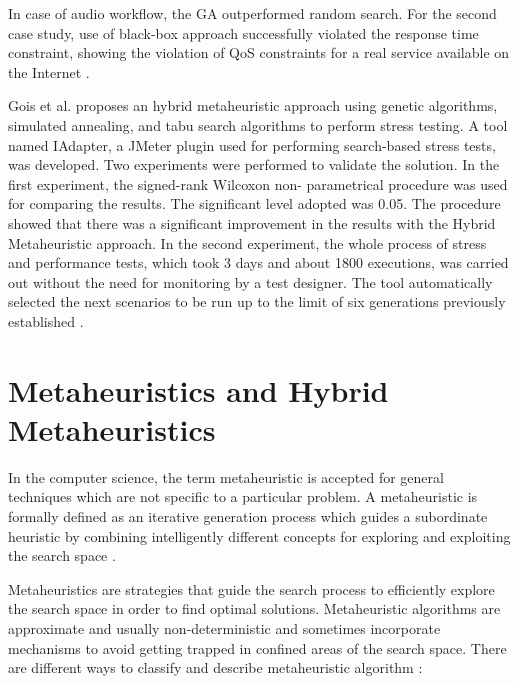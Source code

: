 In case of audio workflow, the GA outperformed random search. For the second case study, use of black-box approach successfully violated the response time constraint, showing the violation of QoS constraints for a real service available on the Internet \cite{Penta2007}.


Gois et al. proposes an hybrid metaheuristic approach using genetic algorithms, simulated annealing, and tabu search algorithms to perform stress testing. A tool named IAdapter, a JMeter plugin used for performing search-based stress tests, was developed. Two experiments were performed to validate the solution. In the first experiment, the signed-rank Wilcoxon non- parametrical procedure was used for comparing the results. The significant level adopted was 0.05. The procedure showed that there was a significant improvement in the results with the Hybrid Metaheuristic approach.
In the second experiment, the whole process of stress and performance tests, which took 3 days and about 1800 executions, was carried out without the need for monitoring by a test designer. The tool automatically selected the next scenarios to be run up to the limit of six generations previously established \cite{Gois2016}. 

\section{Metaheuristics and Hybrid Metaheuristics}

In the computer science, the term metaheuristic is accepted for general techniques which are not specific to a particular problem. A metaheuristic is formally defined as an iterative generation process which guides a subordinate heuristic by combining intelligently different concepts for exploring and exploiting the search space \cite{raidl2010metaheuristic}. 

Metaheuristics are strategies that guide the search process to efficiently explore the search space in order to find optimal solutions. Metaheuristic algorithms are approximate and usually non-deterministic and sometimes incorporate mechanisms to avoid getting trapped in confined areas of the search space. There are different ways to classify and describe metaheuristic algorithm \cite{Blum2003}:

